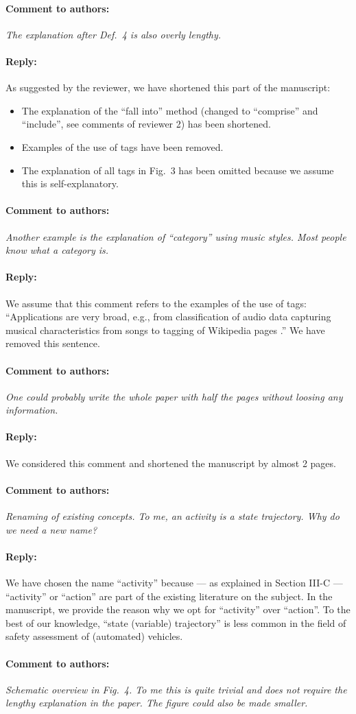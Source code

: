 \documentclass[10pt,final,a4paper,oneside,onecolumn]{article}
\newcommand{\toauthor}{\paragraph*{Comment to authors:} \itshape}
\newcommand{\fromauthor}{\paragraph*{Reply:} \normalfont}
\newcommand{\cstart}{\cbstart\color{red}}
\newcommand{\cend}{\cbend\color{black}}
\begin{document}
\toauthor The explanation after Def.~4 is also overly lengthy. 

\fromauthor As suggested by the reviewer, we have shortened this part of the manuscript:
\begin{itemize}
	\item The explanation of the ``fall into'' method (changed to \cstart ``comprise'' \cend and \cstart ``include''\cend, see comments of reviewer 2) has been shortened.
	\item Examples of the use of tags have been removed.
	\item The explanation of all tags in Fig.~3 has been omitted because we assume this is self-explanatory.
\end{itemize}



\toauthor Another example is the explanation of ``category'' using music styles. Most people know what a category is.  

\fromauthor We assume that this comment refers to the examples of the use of tags: ``Applications are very broad, e.g., from classification of audio data \autocite{kong2017joint} capturing musical characteristics from songs \autocite{ellis2011semantic} to tagging of Wikipedia pages \autocite{voss2006collaborative}.'' We have removed this sentence.



\toauthor One could probably write the whole paper with half the pages without loosing any information.

\fromauthor We considered this comment and shortened the manuscript by almost 2 pages.



\toauthor Renaming of existing concepts. To me, an activity is a state trajectory. Why do we need a new name?

\fromauthor We have chosen the name ``activity'' because --- as explained in Section III-C --- ``activity'' \autocite{elrofai2018scenario,catapult2018musicc} or ``action'' \autocite{ulbrich2015} are part of the existing literature on the subject. In the manuscript, we provide the reason why we opt for ``activity'' over ``action''. To the best of our knowledge, ``state (variable) trajectory'' is less common in the field of safety assessment of (automated) vehicles.



\toauthor Schematic overview in Fig.~4. To me this is quite trivial and does not require the lengthy explanation in the paper. The figure could also be made smaller.
\end{document}
